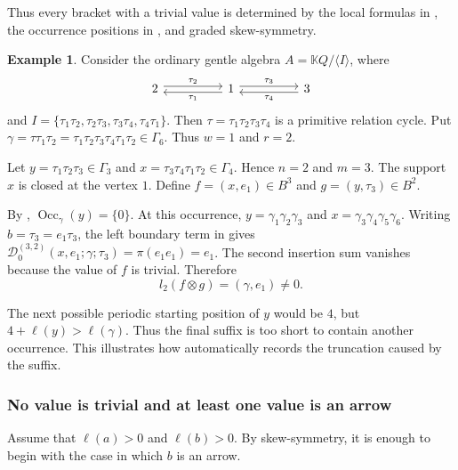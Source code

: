 \documentclass[11pt,a4paper,reqno]{amsart}
\newcommand{\mK}{\mathbb K}
\newcommand{\mD}{\mathcal D}
\newcommand{\Occ}{\operatorname{Occ}}
\newcommand{\para}[2]{(#1,#2)}
\theoremstyle{plain}
\theoremstyle{definition}
\newtheorem{example}[example]{Example}
\numberwithin{equation}{section}
\begin{document}
	Thus every bracket with a trivial value is determined by the local formulas
	in , the occurrence positions in
	, and graded skew-symmetry.
	\begin{example}
		\label{ex:suffix-trivial-value}
		Consider the ordinary gentle algebra
		$A=\mK Q/\langle I\rangle$,
		where
		\[\begin{tikzcd}
			2 && 1 && 3
			\arrow["{\tau_2}", shift left, from=1-1, to=1-3]
			\arrow["{\tau_1}", shift left, from=1-3, to=1-1]
			\arrow["{\tau_3}", shift left, from=1-3, to=1-5]
			\arrow["{\tau_4}", shift left, from=1-5, to=1-3]
		\end{tikzcd}\]
		and
		$I= \{ \tau_1\tau_2,  \tau_2\tau_3,  \tau_3\tau_4,  \tau_4\tau_1 \}$.
		Then
		$\tau=\tau_1\tau_2\tau_3\tau_4$
		is a primitive relation cycle.  Put
		$\gamma=\tau\tau_1\tau_2 = \tau_1\tau_2\tau_3\tau_4\tau_1\tau_2 \in\Gamma_6$.
		Thus
		$w=1$ and $r=2$.
		
		Let
		$y=\tau_1\tau_2\tau_3\in\Gamma_3$ and $x=\tau_3\tau_4\tau_1\tau_2\in\Gamma_4$.
		Hence
		$n=2$ and $m=3$.
		The support $x$ is closed at the vertex $1$.  Define
		$f=\para{x}{e_1}\in B^3$ and $g=\para{y}{\tau_3}\in B^2$.
		
		By ,
		$\Occ_\gamma(y)=\{0\}$.
		At this occurrence,
		$y=\gamma_1\gamma_2\gamma_3$ and $x=\gamma_3\gamma_4\gamma_5\gamma_6$.
		Writing
		$b=\tau_3=e_1\tau_3$,
		the left boundary term in
		 gives $\mD_0^{(3,2)}(x,e_1;\gamma;\tau_3)=\pi(e_1e_1)=e_1$.
		The second insertion sum vanishes because the value of $f$ is trivial.
		Therefore
		\[
		l_2(f\otimes g)
		=
		\para{\gamma}{e_1}
		\neq0.
		\]
		
		The next possible periodic starting position of $y$ would be $4$, but
		$4+\ell(y)>\ell(\gamma)$.
		Thus the final suffix is too short to contain another occurrence.  This
		illustrates how  automatically records the
		truncation caused by the suffix.
	\end{example}
	\subsubsection{No value is trivial and at least one value is an arrow}
	
	Assume that $\ell(a)>0$ and $\ell(b)>0$.
	By skew-symmetry, it is enough to begin with the case in which $b$ is an
	arrow.
	
\end{document}
